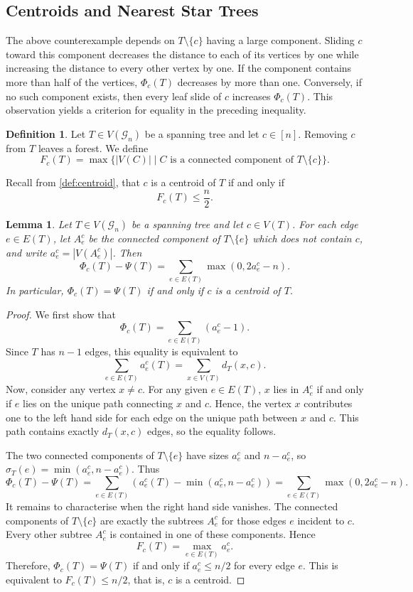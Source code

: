 \documentclass[reqno,dvipsnames]{amsart}
\theoremstyle{plain}
\newtheorem{lemma}[theorem]{Lemma}
\numberwithin{equation}{section}
\theoremstyle{definition}
\newtheorem{definition}[theorem]{Definition}
\begin{document}
\subsection{Centroids and Nearest Star Trees}

The above counterexample depends on $T\setminus \{c\}$ having a large component. Sliding $c$ toward this component decreases the distance to each of its vertices by one while increasing the distance to every other vertex by one. If the component contains more than half of the vertices, $\Phi_c(T)$ decreases by more than one. Conversely, if no such component exists, then every leaf slide of $c$ increases $\Phi_c(T)$. This observation yields a criterion for equality in the preceding inequality.

\begin{definition}
	Let $T\in V(\mathcal{G}_n)$ be a spanning tree and let $c\in [n]$. Removing $c$
	from $T$ leaves a forest. We define
	\[
	F_c(T)
	=
	\max\{|V(C)| \mid C \text{ is a connected component of } T\setminus \{c\}\}.
	\]
\end{definition}
	Recall from \autoref{def:centroid}, that $c$ is a centroid of $T$ if and only if 
	\[
	F_c(T)\leq \frac n2.
	\]


\begin{lemma}\label{PhiPsiDifference}
	Let $T\in V(\mathcal{G}_n)$ be a spanning tree and let $c\in V(T)$. For each edge $e\in E(T)$, let $A_e^c$ be the connected component of $T\setminus \{e\}$ which does not contain $c$, and write $a_e^c = |V(A_e^c)|$. Then
	\[
	\Phi_c(T)-\Psi(T) =	\sum_{e\in E(T)}\max(0,2a_e^c-n).
	\]
	In particular, $\Phi_c(T)=\Psi(T)$ if and only if $c$ is a centroid of $T$.
\end{lemma}

\begin{proof}
    We first show that 
    \[
    \Phi_c(T) = \sum_{e\in E(T)}(a_e^c-1).
    \]
    Since $T$ has $n-1$ edges, this equality is equivalent to 
    \[
    \sum_{e\in E(T)}a_e^c(T) = \sum_{x\in V(T)} d_T(x,c).
    \]
    Now, consider any vertex $x\neq c$. For any given $e\in E(T)$, $x$ lies in $A_e^c$ if and only if $e$ lies on the unique path connecting $x$ and $c$. Hence, the vertex $x$ contributes one to the left hand side for each edge on the unique path between $x$ and $c$. This path contains exactly $d_T(x,c)$ edges, so the equality follows.

    The two connected components of $T\setminus \{e\}$ have sizes $a_e^c$ and $n- a_e^c$, so $\sigma_T(e) = \min(a_e^c, n- a_e^c)$. Thus
    \[
    \Phi_c(T)-\Psi(T) = \sum_{e\in E(T)} \left(a_e^c(T) - \min(a_e^c, n- a_e^c) \right)= \sum_{e\in E(T)}\max(0,2a_e^c-n).
    \]
    It remains to characterise when the right hand side vanishes. The connected	components of $T\setminus \{c\}$ are exactly the subtrees $A_e^c$ for those	edges $e$ incident to $c$. Every other subtree $A_e^c$ is contained in one of these components. Hence
	\[
	F_c(T)=\max_{e\in E(T)}a_e^c.
	\]
	Therefore, $\Phi_c(T)=\Psi(T)$ if and only if $a_e^c\leq n/2$ for every edge $e$. This is equivalent to $F_c(T) \leq n/2$, that is, $c$ is a centroid. 
\end{proof}
\end{document}
